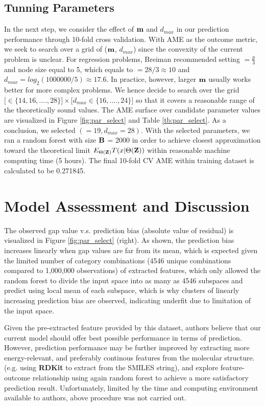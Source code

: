\documentclass[11pt]{article}
\theoremstyle{definition}
\begin{document}
\subsection{\textbf{Tunning Parameters}}
In the next step, we consider the effect of ${\bf m}$ and $d_{max}$ in our prediction performance through 10-fold cross validation. With AME as the outcome metric, we seek to search over a grid of (${\bf m}$, $d_{max}$) since the convexity of the current problem is unclear. For regression problems, Breiman recommended setting $\bm = \frac{p}{3}$ and node size equal to 5, which equals to $\bm = 28/3 \approx 10$ and $d_{max} = log_2(1000000/5) \approx 17.6$. In practice, however, larger ${\bf m}$ usually works better for more complex problems. We hence decide to search over the grid $\big[ \bm \in \{14, 16, ...., 28\} \big] \times \big[ d_{max} \in \{16, ...., 24\} \big]$ so that it covers a reasonable range of the theoretically sound values. The AME surface over candidate parameter values are visualized in Figure \ref{fig:par_select} and Table \ref{tb:par_select}. As a conclusion, we selected $(\bm = 19, d_{max} = 28)$. With the selected parameters, we ran a random forest with size ${\bf B}$ = 2000 in order to achieve closest approximation toward the theoretical limit $E_{\Theta({\bf Z})}T(x|\Theta({\bf Z}))$ within reasonable machine computing time (5 hours). The final 10-fold CV AME within training dataset is calculated to be 0.271845.

\newpage
\section{\textbf{Model Assessment and Discussion}}
The observed gap value v.s. prediction bias (absolute value of residual) is visualized in Figure \ref{fig:par_select} (right). As shown, the prediction bias increases linearly when gap values are far from its mean, which is expected given the limited number of category combinations (4546 unique combinations compared to 1,000,000 observations) of extracted features, which only allowed the random forest to divide the input space into as many as 4546 subspaces and predict using local mean of each subspace, which is why  clusters of linearly increasing prediction bias are observed, indicating underfit due to limitation of the input space.

Given the pre-extracted feature provided by this dataset, authors believe that  our current model should offer best possible performance in terms of prediction. However, prediction performance may be further improved by extracting more energy-relevant, and preferably continous features from the molecular structure. (e.g. using \textbf{RDKit} to extract from the SMILES string), and explore feature-outcome relationship  using again random forest to achieve a more satisfactory prediction result. Unfortunately, limited by the time and computing environment available to authors, above procedure was not carried out.
\end{document}
